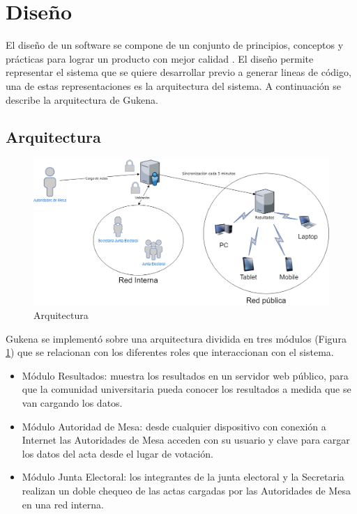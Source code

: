 \section{Diseño}
El diseño de un software se compone de un conjunto de principios, conceptos y prácticas para lograr un producto con mejor calidad \cite{pressman1988ingenieria}. El diseño permite representar el sistema que se quiere desarrollar previo a generar lineas de código, una de estas representaciones es la arquitectura del sistema. A continuación se describe la arquitectura de Gukena. 

\subsection{Arquitectura}

\begin{figure}[h!]
  \includegraphics[width=\textwidth]{img/arquitectura.png}
  \caption{Arquitectura}
  \label{graf:arquitectura}
\end{figure}

Gukena se implementó sobre una arquitectura dividida en tres módulos (Figura \ref{graf:arquitectura}) que se relacionan con los diferentes roles que interaccionan con el sistema.
\begin{itemize}
\item Módulo Resultados: muestra los resultados en un servidor web público, para que la comunidad universitaria pueda conocer los resultados a medida que se van cargando los datos.
\item Módulo Autoridad de Mesa: desde cualquier dispositivo con conexión a Internet las Autoridades de Mesa acceden con su usuario y clave para cargar los datos del acta desde el lugar de votación.
\item Módulo Junta Electoral: los integrantes de la junta electoral y la Secretaria realizan un doble chequeo de las actas cargadas por las Autoridades de Mesa en una red interna.
\end{itemize}

